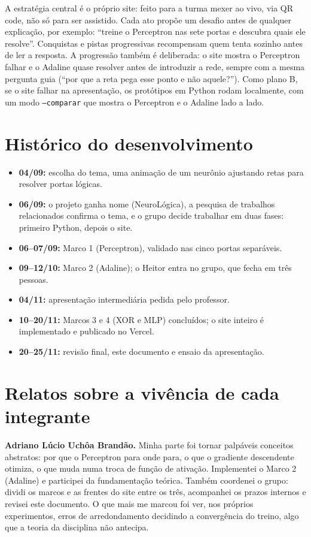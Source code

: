 \documentclass[11pt]{article}
\begin{document}
A estratégia central é o próprio site: feito para a turma mexer ao vivo, via QR code, não só
para ser assistido. Cada ato propõe um desafio antes de qualquer explicação, por exemplo:
\enquote{treine o Perceptron nas sete portas e descubra quais ele resolve}. Conquistas e
pistas progressivas recompensam quem tenta sozinho antes de ler a resposta. A progressão
também é deliberada: o site mostra o Perceptron falhar e o Adaline quase resolver antes de
introduzir a rede, sempre com a mesma pergunta guia (\enquote{por que a reta pega esse ponto
e não aquele?}). Como plano B, se o site falhar na apresentação, os protótipos em Python
rodam localmente, com um modo \texttt{--comparar} que mostra o Perceptron e o Adaline lado a
lado.

\section{Histórico do desenvolvimento}

\begin{itemize}
    \item \textbf{04/09:} escolha do tema, uma animação de um neurônio ajustando retas para
    resolver portas lógicas.
    \item \textbf{06/09:} o projeto ganha nome (NeuroLógica), a pesquisa de trabalhos
    relacionados confirma o tema, e o grupo decide trabalhar em duas fases: primeiro Python,
    depois o site.
    \item \textbf{06--07/09:} Marco 1 (Perceptron), validado nas cinco portas separáveis.
    \item \textbf{09--12/10:} Marco 2 (Adaline); o Heitor entra no grupo, que fecha em três
    pessoas.
    \item \textbf{04/11:} apresentação intermediária pedida pelo professor.
    \item \textbf{10--20/11:} Marcos 3 e 4 (XOR e MLP) concluídos; o site inteiro é
    implementado e publicado no Vercel.
    \item \textbf{20--25/11:} revisão final, este documento e ensaio da apresentação.
\end{itemize}

\section{Relatos sobre a vivência de cada integrante}

\textbf{Adriano Lúcio Uchôa Brandão.} Minha parte foi tornar palpáveis conceitos abstratos:
por que o Perceptron para onde para, o que o gradiente descendente otimiza, o que muda numa
troca de função de ativação. Implementei o Marco 2 (Adaline) e participei da fundamentação
teórica. Também coordenei o grupo: dividi os marcos e as frentes do site entre os três,
acompanhei os prazos internos e revisei este documento. O que mais me marcou foi ver, nos
próprios experimentos, erros de arredondamento decidindo a convergência do treino, algo que
a teoria da disciplina não antecipa.
\end{document}

